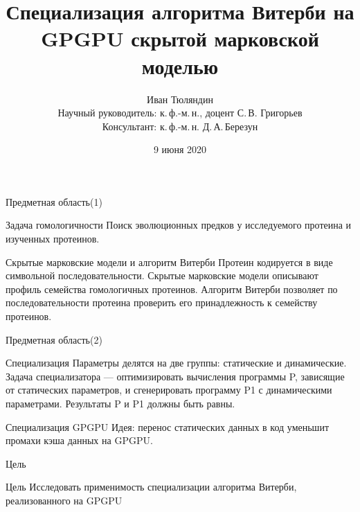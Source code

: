 \documentclass[hyperref={pdfpagelabels=false}]{beamer}
\begin{document}
  
\title[Специализация алгоритма Витерби]{Специализация алгоритма Витерби на GPGPU скрытой марковской моделью}  
\author[И. Тюляндин]{Иван Тюляндин\\%
Научный руководитель: к.\,ф.-м.\,н., доцент С.\,В. Григорьев\\%
Консультант: к.\,ф.-м.\,н. Д.\,А.\,Березун\\%
} 
\date{9 июня 2020} 
{
}


\begin{frame}{Предметная область(1)}
	\begin{block}{Задача гомологичности}
	Поиск эволюционных предков у исследуемого протеина и изученных протеинов.
	\end{block}
	\vfill
	\begin{block}{Скрытые марковские модели и алгоритм Витерби}
	Протеин кодируется в виде символьной последовательности.
	Скрытые марковские модели описывают профиль семейства гомологичных 
	протеинов.
	Алгоритм Витерби позволяет по последовательности протеина проверить его принадлежность к семейству протеинов.
	\end{block}
\end{frame} 


\begin{frame}{Предметная область(2)}
	\begin{block}{Специализация} 
	Параметры делятся на две группы: статические и динамические.\\
	Задача специализатора --- оптимизировать вычисления программы P, 
	зависящие от статических параметров, и сгенерировать программу P1 с 
	динамическими параметрами.
	Результаты P и P1 должны быть равны.
	\end{block}
	\vfill
	\begin{block}{Специализация GPGPU}
	Идея: перенос статических данных в код уменьшит промахи кэша данных на 
	GPGPU.
	\end{block}
\end{frame} 


\begin{frame}{Цель}
\begin{block}{Цель}
Исследовать применимость специализации алгоритма Витерби, реализованного на 
GPGPU
\end{block}
\end{frame}
\end{document}
